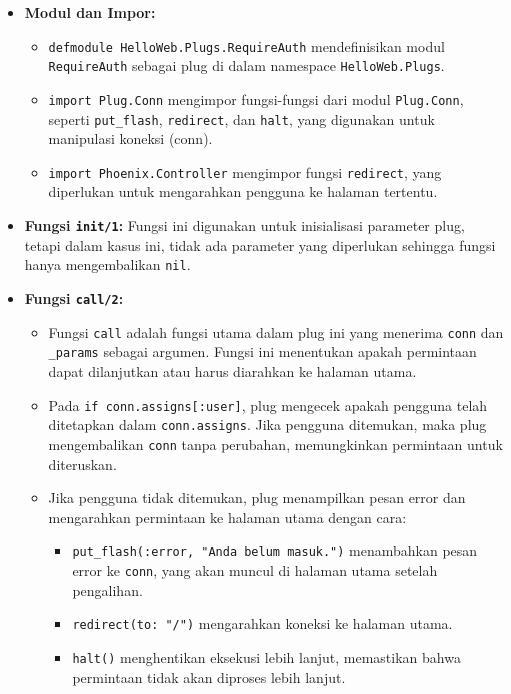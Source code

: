 \begin{itemize}
	\item \textbf{Modul dan Impor:}
	\begin{itemize}
		\item \texttt{defmodule HelloWeb.Plugs.RequireAuth} mendefinisikan modul \texttt{RequireAuth} sebagai plug di dalam namespace \texttt{HelloWeb.Plugs}.
		\item \texttt{import Plug.Conn} mengimpor fungsi-fungsi dari modul \texttt{Plug.Conn}, seperti \texttt{put\_flash}, \texttt{redirect}, dan \texttt{halt}, yang digunakan untuk manipulasi koneksi (conn).
		\item \texttt{import Phoenix.Controller} mengimpor fungsi \texttt{redirect}, yang diperlukan untuk mengarahkan pengguna ke halaman tertentu.
	\end{itemize}
	
	\item \textbf{Fungsi \texttt{init/1}:} Fungsi ini digunakan untuk inisialisasi parameter plug, tetapi dalam kasus ini, tidak ada parameter yang diperlukan sehingga fungsi hanya mengembalikan \texttt{nil}.
	
	\item \textbf{Fungsi \texttt{call/2}:}
	\begin{itemize}
		\item Fungsi \texttt{call} adalah fungsi utama dalam plug ini yang menerima \texttt{conn} dan \texttt{\_params} sebagai argumen. Fungsi ini menentukan apakah permintaan dapat dilanjutkan atau harus diarahkan ke halaman utama.
		\item Pada \texttt{if conn.assigns[:user]}, plug mengecek apakah pengguna telah ditetapkan dalam \texttt{conn.assigns}. Jika pengguna ditemukan, maka plug mengembalikan \texttt{conn} tanpa perubahan, memungkinkan permintaan untuk diteruskan.
		\item Jika pengguna tidak ditemukan, plug menampilkan pesan error dan mengarahkan permintaan ke halaman utama dengan cara:
		\begin{itemize}
			\item \texttt{put\_flash(:error, "Anda belum masuk.")} menambahkan pesan error ke \texttt{conn}, yang akan muncul di halaman utama setelah pengalihan.
			\item \texttt{redirect(to: "/")} mengarahkan koneksi ke halaman utama.
			\item \texttt{halt()} menghentikan eksekusi lebih lanjut, memastikan bahwa permintaan tidak akan diproses lebih lanjut.
		\end{itemize}
	\end{itemize}
\end{itemize}

